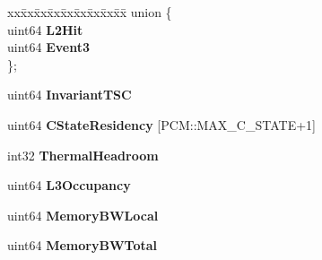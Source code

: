 \begin{DoxyCompactItemize}
\begin{tabbing}
\end{tabbing}\item 
\begin{tabbing}
xx\=xx\=xx\=xx\=xx\=xx\=xx\=xx\=xx\=\kill
union \{\\
\>uint64 {\bfseries L2Hit}\\
\>uint64 {\bfseries Event3}\\
\}; \label{classBasicCounterState_a4916830df8f468c47f33b7e9d66fdd22}
\\

\end{tabbing}\item 
uint64 {\bfseries Invariant\+T\+SC}\label{classBasicCounterState_af357162e5b43c6dfc0ce92fd56fa30a0}

\item 
uint64 {\bfseries C\+State\+Residency} [P\+C\+M\+::\+M\+A\+X\+\_\+\+C\+\_\+\+S\+T\+A\+TE+1]\label{classBasicCounterState_af9069c972052bac5ed648e519e03da9c}

\item 
int32 {\bfseries Thermal\+Headroom}\label{classBasicCounterState_a4950fe3761b2ac599a7ae64ec7bee973}

\item 
uint64 {\bfseries L3\+Occupancy}\label{classBasicCounterState_a99dab23e20418b86be72dda1ecd8858c}

\item 
uint64 {\bfseries Memory\+B\+W\+Local}\label{classBasicCounterState_a115320ce0518d55acd0db90c127419b8}

\item 
uint64 {\bfseries Memory\+B\+W\+Total}\label{classBasicCounterState_a97a5bc9ad3dc45a876a34740537e54a8}

\end{DoxyCompactItemize}
